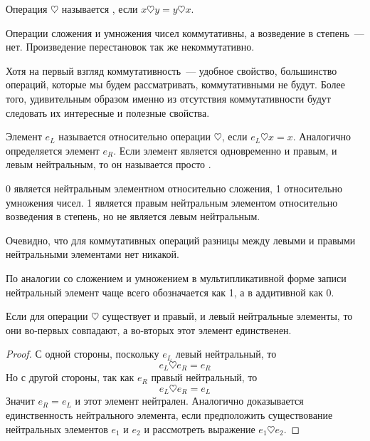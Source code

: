\begin{definition}
Операция $\heartsuit$ называется , если $x\heartsuit y = y\heartsuit x$.
\end{definition}

\begin{example}
Операции сложения и умножения чисел коммутативны, а возведение в степень~— нет. Произведение перестановок так же некоммутативно.
\end{example}

Хотя на первый взгляд коммутативность~— удобное свойство, большинство операций, которые мы будем рассматривать, коммутативными не будут. Более того, удивительным образом именно из отсутствия коммутативности будут следовать их интересные и полезные свойства.

\begin{definition}
Элемент $e_L$ называется  относительно операции $\heartsuit$, если $e_L\heartsuit x = x$. Аналогично определяется  элемент $e_R$. Если элемент является одновременно и правым, и левым нейтральным, то он называется просто .
\end{definition}

\begin{example}
0 является нейтральным элементном относительно сложения, 1 относительно умножения чисел. 1 является правым нейтральным элементом относительно возведения в степень, но не является левым нейтральным.
\end{example}

Очевидно, что для коммутативных операций разницы между левыми и правыми нейтральными элементами нет никакой.

По аналогии со сложением и умножением в мультипликативной форме записи нейтральный элемент чаще всего обозначается как 1, а в аддитивной как 0.

\begin{thm}
Если для операции $\heartsuit$ существует и правый, и левый нейтральные элементы, то они во-первых совпадают, а во-вторых этот элемент единственен.
\end{thm}
\begin{proof}
С одной стороны, поскольку $e_L$ левый нейтральный, то
$$e_L\heartsuit e_R = e_R$$
Но с другой стороны, так как $e_R$ правый нейтральный, то
$$e_L\heartsuit e_R = e_L$$
Значит $e_R=e_L$ и этот элемент нейтрален. Аналогично доказывается единственность нейтрального элемента, если предположить существование нейтральных элементов $e_1$ и $e_2$ и рассмотреть выражение $e_1\heartsuit e_2$. 
\end{proof}

